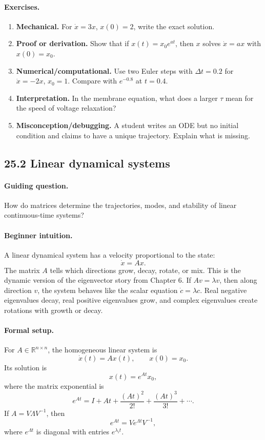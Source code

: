 \paragraph{Exercises.}
\begin{enumerate}[label=\textbf{25.1.\arabic*.}, leftmargin=*]
\item \textbf{Mechanical.} For \(\dot x=3x\), \(x(0)=2\), write the exact solution.
\item \textbf{Proof or derivation.} Show that if \(x(t)=x_0e^{at}\), then \(x\) solves \(\dot x=ax\) with \(x(0)=x_0\).
\item \textbf{Numerical/computational.} Use two Euler steps with \(\Delta t=0.2\) for \(\dot x=-2x\), \(x_0=1\). Compare with \(e^{-0.8}\) at \(t=0.4\).
\item \textbf{Interpretation.} In the membrane equation, what does a larger \(\tau\) mean for the speed of voltage relaxation?
\item \textbf{Misconception/debugging.} A student writes an ODE but no initial condition and claims to have a unique trajectory. Explain what is missing.
\end{enumerate}

\subsection{25.2 Linear dynamical systems}

\paragraph{Guiding question.}
How do matrices determine the trajectories, modes, and stability of linear continuous-time systems?

\paragraph{Beginner intuition.}
A linear dynamical system has a velocity proportional to the state:
\[
\dot x=Ax.
\]
The matrix \(A\) tells which directions grow, decay, rotate, or mix. This is the dynamic version of the eigenvector story from Chapter 6. If \(Av=\lambda v\), then along direction \(v\), the system behaves like the scalar equation \(\dot c=\lambda c\). Real negative eigenvalues decay, real positive eigenvalues grow, and complex eigenvalues create rotations with growth or decay.

\paragraph{Formal setup.}
For \(A\in\mathbb{R}^{n\times n}\), the homogeneous linear system is
\[
\dot x(t)=Ax(t),\qquad x(0)=x_0.
\]
Its solution is
\[
\boxed{x(t)=e^{At}x_0,}
\]
where the matrix exponential is
\[
e^{At}=I+At+\frac{(At)^2}{2!}+\frac{(At)^3}{3!}+\cdots.
\]
If \(A=V\Lambda V^{-1}\), then
\[
e^{At}=Ve^{\Lambda t}V^{-1},
\]
where \(e^{\Lambda t}\) is diagonal with entries \(e^{\lambda_i t}\).

